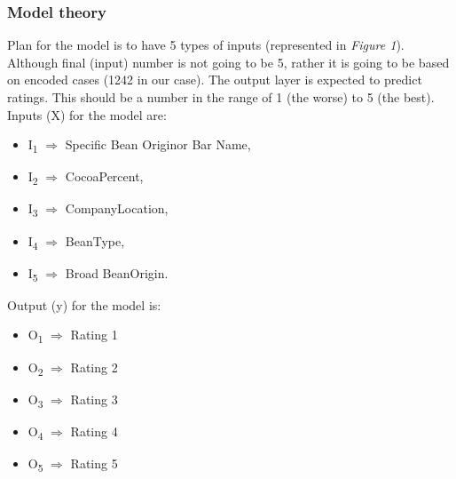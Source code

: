\subsubsection{Model theory}
Plan for the model is to have 5 types of inputs (represented in \emph{Figure 1}). Although final (input) number is not going to be 5, rather it is going to be based on encoded cases (1242 in our case).
The output layer is expected to predict ratings. This should be a number in the range of 1 (the worse) to 5 (the best).
\newline
Inputs (X) for the model are:
\begin{itemize}
  \item I\textsubscript{1} $\Rightarrow$ Specific Bean Originor Bar Name,
  \item I\textsubscript{2} $\Rightarrow$ CocoaPercent,
  \item I\textsubscript{3} $\Rightarrow$ CompanyLocation,
  \item I\textsubscript{4} $\Rightarrow$ BeanType,
  \item I\textsubscript{5} $\Rightarrow$ Broad BeanOrigin.
\end{itemize}
Output (y) for the model is:
\begin{itemize}
  \item O\textsubscript{1} $\Rightarrow$ Rating 1
  \item O\textsubscript{2} $\Rightarrow$ Rating 2
  \item O\textsubscript{3} $\Rightarrow$ Rating 3
  \item O\textsubscript{4} $\Rightarrow$ Rating 4
  \item O\textsubscript{5} $\Rightarrow$ Rating 5
\end{itemize}